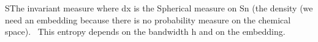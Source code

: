 SThe invariant measure where dx is the Spherical measure on Sn (the density (we need an embedding because there is no probability measure on the chemical space). 
This entropy depends on the bandwidth h and on the embedding.

